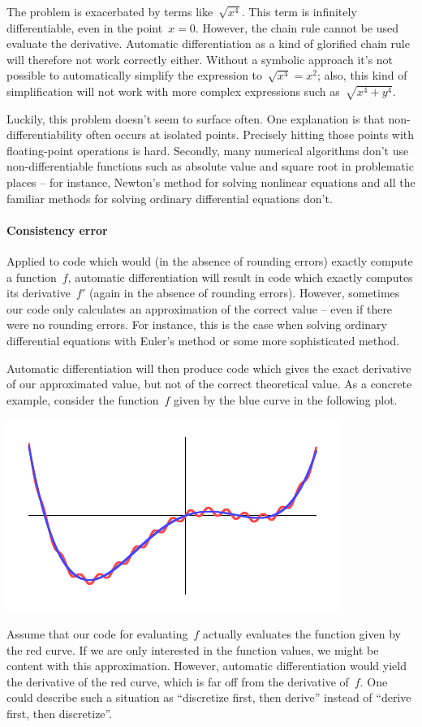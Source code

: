 \documentclass[a4paper,ngerman,12pt]{scrartcl}
\theoremstyle{definition}
\theoremstyle{plain}
\theoremstyle{remark}
\begin{document}
The problem is exacerbated by terms like~$\sqrt{x^4}$. This term is infinitely
differentiable, even in the point~$x = 0$. However, the chain rule cannot be
used evaluate the derivative. Automatic differentiation as a kind of glorified
chain rule will therefore not work correctly either. Without a symbolic
approach it's not possible to automatically simplify the expression
to~$\sqrt{x^4} = x^2$; also, this kind of simplification will not work with
more complex expressions such as~$\sqrt{x^4 + y^4}$.

Luckily, this problem doesn't seem to surface often. One explanation is that
non-dif\-fe\-ren\-tia\-bi\-li\-ty often occurs at isolated points. Precisely hitting those
points with floating-point operations is hard. Secondly, many numerical
algorithms don't use non-differentiable functions such as absolute value and
square root in problematic places -- for instance, Newton's method for solving
nonlinear equations and all the familiar methods for solving ordinary differential
equations don't.

\paragraph{Consistency error} Applied to code which would (in the absence of
rounding errors) exactly compute a function~$f$, automatic differentiation will
result in code which exactly computes its derivative~$f'$ (again in the absence
of rounding errors). However, sometimes our code only calculates an
approximation of the correct value -- even if there were no rounding errors.
For instance, this is the case when solving ordinary differential equations
with Euler's method or some more sophisticated method.

Automatic differentiation will then produce code which gives the exact
derivative of our approximated value, but not of the correct theoretical value.
As a concrete example, consider the function~$f$ given by the blue curve in the
following plot.
\begin{center}\includegraphics{consistency-error}\end{center}
Assume that our code for evaluating~$f$ actually evaluates the function given
by the red curve. If we are only interested in the function values, we might be
content with this approximation. However, automatic differentiation would yield
the derivative of the red curve, which is far off from the derivative of~$f$.
One could describe such a situation as ``discretize first, then
derive'' instead of ``derive first, then discretize''.
\end{document}
